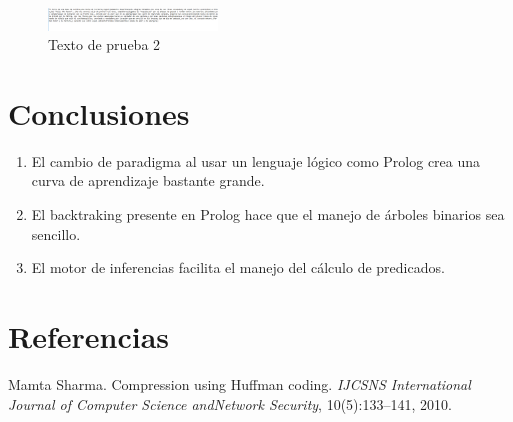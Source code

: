 \documentclass{IEEEtran}
\begin{document}
\begin{figure}[!ht]
  \caption{Texto de prueba 2}
  \centering
    \includegraphics[width=0.4\textwidth]{Prueba_6.png}
\end{figure}

\section{Conclusiones}
\begin{enumerate}
  \item El cambio de paradigma al usar un lenguaje l\'ogico como Prolog crea una curva de aprendizaje bastante grande.
  \item El backtraking presente en Prolog hace que el manejo de \'arboles binarios sea sencillo.
  \item El motor de inferencias facilita el manejo del c\'alculo de predicados.
\end{enumerate}

\section{Referencias}

\begin{thebibliography}{99}

 Mamta  Sharma.   Compression  using  Huffman  coding. \emph{IJCSNS International Journal of Computer Science andNetwork Security}, 10(5):133–141, 2010.
\end{thebibliography}
\end{document}

